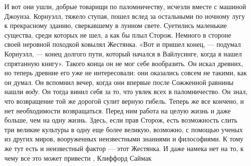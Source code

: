 И вот они ушли, добрые товарищи по паломничеству, исчезли вместе с машиной
Джоунза.  Корнуэлл, тяжело ступая, пошел вслед за остальными по ночному лугу к
прекрасному зданию, сверкавшему в лунном свете. Суетились маленькие существа,
среди которых не шел, а как бы плыл Сторож. Немного в стороне своей неровной
походкой ковылял Жестянка.  «Вот и пришел конец, — подумал Корнуэлл, — конец
долгого пути, который начался в Вайлусинге, когда я нашел спрятанную книгу».
Такого конца он не мог себе вообразить. Он искал древних, но теперь древние его
уже не интересовали: они оказались совсем не такими, как он думал.  Он вспомнил
вечер, когда они впервые после Сожженной равнины нашли \emph{воду}. Он тогда винил
себя за то, что увлек всех в паломничество. Он знал, что возвращение той же
дорогой сулит верную гибель. Теперь же все кончено, и нет необходимости
возвращаться. Перед ним работа на целую жизнь и даже больше, чем на одну жизнь.
Здесь, если прав Сторож, есть возможность слить три великие культуры в одну еще
более великую, возможно, с помощью ученых из других миров, вооруженных
неизвестными знаниями и философиями. К тому же тут есть и неизвестный фактор —
этот Жестянка. И даже намека нет на то, к чему все это может привести
, Клиффорд Саймак
